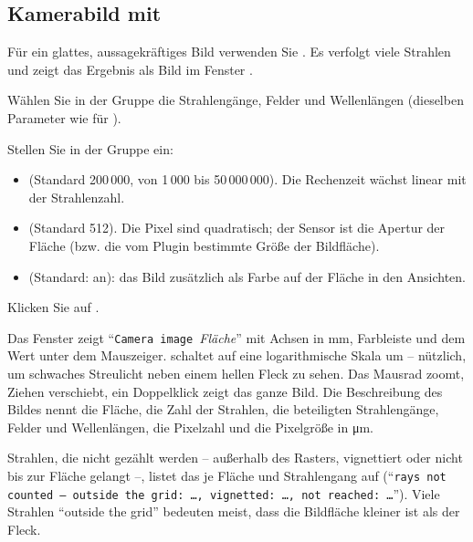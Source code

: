 \subsection{Kamerabild mit }

Für ein glattes, aussagekräftiges Bild verwenden Sie . Es verfolgt viele
Strahlen und zeigt das Ergebnis als Bild im Fenster .

\begin{schritte}
  \item Wählen Sie in der Gruppe  die Strahlengänge, Felder und Wellenlängen
    (dieselben Parameter wie für ).
  \item Stellen Sie in der Gruppe  ein:
    \begin{itemize}
      \item {} (Standard 200\,000, von 1\,000 bis
        50\,000\,000). Die Rechenzeit wächst linear mit der Strahlenzahl.
      \item {} (Standard 512). Die Pixel sind quadratisch; der Sensor ist
        die Apertur der Fläche (bzw. die vom Plugin bestimmte Größe der Bildfläche).
      \item {} (Standard: an): das Bild zusätzlich als Farbe auf der
        Fläche in den Ansichten.
    \end{itemize}
  \item Klicken Sie auf .
\end{schritte}

Das Fenster  zeigt \enquote{\texttt{Camera image }\textit{Fläche}} mit Achsen in mm,
Farbleiste und dem Wert unter dem Mauszeiger.  schaltet auf eine logarithmische Skala
um -- nützlich, um schwaches Streulicht neben einem hellen Fleck zu sehen. Das Mausrad zoomt,
Ziehen verschiebt, ein Doppelklick zeigt das ganze Bild. Die Beschreibung des Bildes nennt die
Fläche, die Zahl der Strahlen, die beteiligten Strahlengänge, Felder und Wellenlängen, die
Pixelzahl und die Pixelgröße in \si{\micro\metre}.

\begin{hinweis}
Strahlen, die nicht gezählt werden -- außerhalb des Rasters, vignettiert oder nicht bis zur
Fläche gelangt --, listet das  je Fläche und Strahlengang auf
(\enquote{\texttt{rays not counted – outside the grid: …, vignetted: …, not reached: …}}).
Viele Strahlen \enquote{outside the grid} bedeuten meist, dass die Bildfläche kleiner ist als
der Fleck.
\end{hinweis}

